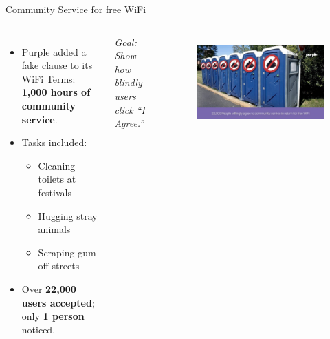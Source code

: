 \begin{frame}{Community Service for free WiFi}
\begin{columns}[c]
    \begin{itemize}
    \item Purple added a fake clause to its WiFi Terms: \textbf{1,000 hours of community service}.
    \item Tasks included:
    \begin{itemize}
        \item Cleaning toilets at festivals
        \item Hugging stray animals
        \item Scraping gum off streets
    \end{itemize}
    \item Over \textbf{22,000 users accepted}; only \textbf{1 person} noticed.
\end{itemize}

\vspace{0.2cm}
\textit{Goal: Show how blindly users click “I Agree.”} 
    \centering
    \begin{figure}
        \centering
        \includegraphics[width=\textwidth]{images/toilet.png}
        \label{fig:toilet}
    \end{figure}    
\end{columns}
\end{frame}

